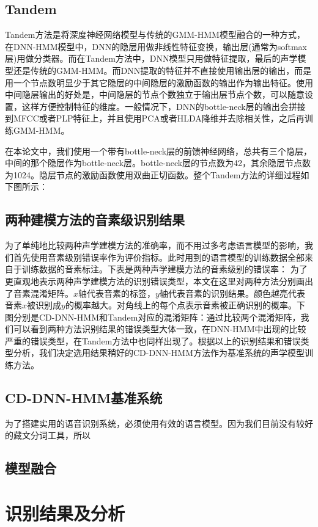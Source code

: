 \subsection{Tandem}
Tandem方法是将深度神经网络模型与传统的GMM-HMM模型融合的一种方式，在DNN-HMM模型中，DNN的隐层用做非线性特征变换，输出层(通常为softmax层)用做分类器。而在Tandem方法中，DNN模型只用做特征提取，最后的声学模型还是传统的GMM-HMM。而DNN提取的特征并不直接使用输出层的输出，而是用一个节点数明显少于其它隐层的中间隐层的激励函数的输出作为输出特征。使用中间隐层输出的好处是，中间隐层的节点个数独立于输出层节点个数，可以随意设置，这样方便控制特征的维度。一般情况下，DNN的bottle-neck层的输出会拼接到MFCC或者PLP特征上，并且使用PCA或者HLDA降维并去除相关性，之后再训练GMM-HMM。

在本论文中，我们使用一个带有bottle-neck层的前馈神经网络，总共有三个隐层，中间的那个隐层作为bottle-neck层。bottle-neck层的节点数为42，其余隐层节点数为1024。隐层节点的激励函数使用双曲正切函数。整个Tandem方法的详细过程如下图所示：{\color{red}{补充期刊论文图2}}
\subsection{两种建模方法的音素级识别结果}
为了单纯地比较两种声学建模方法的准确率，而不用过多考虑语言模型的影响，我们首先使用音素级别错误率作为评价指标。此时用到的语言模型的训练数据全部来自于训练数据的音素标注。下表是两种声学建模方法的音素级别的错误率：{\color{red}{补充期刊论文表2}}
为了更直观地表示两种声学建模方法的识别错误类型，本文在这里对两种方法分别画出了音素混淆矩阵。$x$轴代表音素的标签，$y$轴代表音素的识别结果。颜色越亮代表音素$x$被识别成$y$的概率越大。对角线上的每个点表示音素被正确识别的概率。下图分别是CD-DNN-HMM和Tandem对应的混淆矩阵：{\color{red}{补充期刊论文图3a,3b}}通过比较两个混淆矩阵，我们可以看到两种方法识别结果的错误类型大体一致，在DNN-HMM中出现的比较严重的错误类型，在Tandem方法中也同样出现了。根据以上的识别结果和错误类型分析，我们决定选用结果稍好的CD-DNN-HMM方法作为基准系统的声学模型训练方法。
\subsection{CD-DNN-HMM基准系统}
为了搭建实用的语音识别系统，必须使用有效的语言模型。因为我们目前没有较好的藏文分词工具，所以
\subsection{模型融合}
\section{识别结果及分析}
